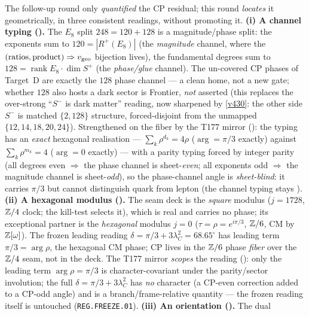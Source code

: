 \begin{winbox}
The follow-up round only \emph{quantified} the CP residual; this round \emph{locates} it geometrically,
in three consistent readings, without promoting it. \textbf{(i) A channel typing
().} The $E_8$ split $248=120+128$ is a
magnitude/phase split: the exponents sum to $120=|R^+(E_8)|$ (the \emph{magnitude} channel, where the
$(\text{ratios},\text{product})\Rightarrow v_{\mathrm{geo}}$ bijection lives), the fundamental degrees sum to
$128=\operatorname{rank}E_8\cdot\dim S^+$ (the \emph{phase/glue} channel). The un-covered CP phases of
Target~D are exactly the $128$ phase channel --- a clean home, not a new gate; whether $128$ also hosts a
dark sector is Frontier, \emph{not} asserted (this replaces the over-strong ``$S^-$ is dark matter''
reading, now sharpened by \vref{v430}: the other side $S^-$ is matched $\{2,128\}$ structure, forced-disjoint from the unmapped $\{12,14,18,20,24\}$).
Strengthened on the fiber by the T177 mirror (): the typing has
an \emph{exact} hexagonal realisation --- $\sum_k\rho^{d_k}=4\rho$ ($\arg=\pi/3$ exactly) against
$\sum_k\rho^{m_k}=4$ ($\arg=0$ exactly) --- with a parity typing forced by integer parity (all degrees
even $\Rightarrow$ the phase channel is sheet-\emph{even}; all exponents odd $\Rightarrow$ the
magnitude channel is sheet-\emph{odd}), so the phase-channel angle is \emph{sheet-blind}: it carries
$\pi/3$ but cannot distinguish quark from lepton (the channel typing stays \mC). \textbf{(ii) A hexagonal modulus ().} The seam
deck is the \emph{square} modulus ($j{=}1728$, $\mathbb{Z}/4$ clock; the kill-test selects it), which is real and
carries no phase; its exceptional partner is the \emph{hexagonal} modulus $j{=}0$ ($\tau{=}\rho{=}e^{i\pi/3}$,
$\mathbb{Z}/6$, CM by $\mathbb{Z}[\omega]$). The frozen leading reading $\delta=\pi/3+3\lambda_C^2=68.65^\circ$ has leading
term $\pi/3=\arg\rho$, the hexagonal CM phase; CP lives in the $\mathbb{Z}/6$ phase \emph{fiber} over the $\mathbb{Z}/4$ seam,
not in the deck. The T177 mirror \emph{scopes} the reading ():
only the leading term $\arg\rho=\pi/3$ is character-covariant under the parity/sector involution; the
full $\delta=\pi/3+3\lambda_C^2$ has \emph{no} character (a CP-even correction added to a CP-odd
angle) and is a branch/frame-relative quantity --- the frozen reading itself is untouched
(\texttt{REG.FREEZE.01}). \textbf{(iii) An orientation ().} The dual

\end{winbox}
